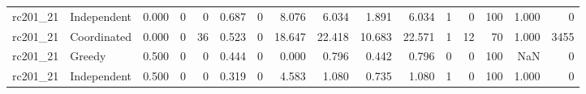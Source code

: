 \begin{tabular}{llrrrrrrrrrrrrrr}
rc201\_21 & Independent & 0.000 & 0 & 0 & 0.687 & 0 & 8.076 & 6.034 & 1.891 & 6.034 & 1 & 0 & 100 & 1.000 & 0 \\
rc201\_21 & Coordinated & 0.000 & 0 & 36 & 0.523 & 0 & 18.647 & 22.418 & 10.683 & 22.571 & 1 & 12 & 70 & 1.000 & 3455 \\
rc201\_21 & Greedy & 0.500 & 0 & 0 & 0.444 & 0 & 0.000 & 0.796 & 0.442 & 0.796 & 0 & 0 & 100 & NaN & 0 \\
rc201\_21 & Independent & 0.500 & 0 & 0 & 0.319 & 0 & 4.583 & 1.080 & 0.735 & 1.080 & 1 & 0 & 100 & 1.000 & 0 \\
\bottomrule
\end{tabular}
